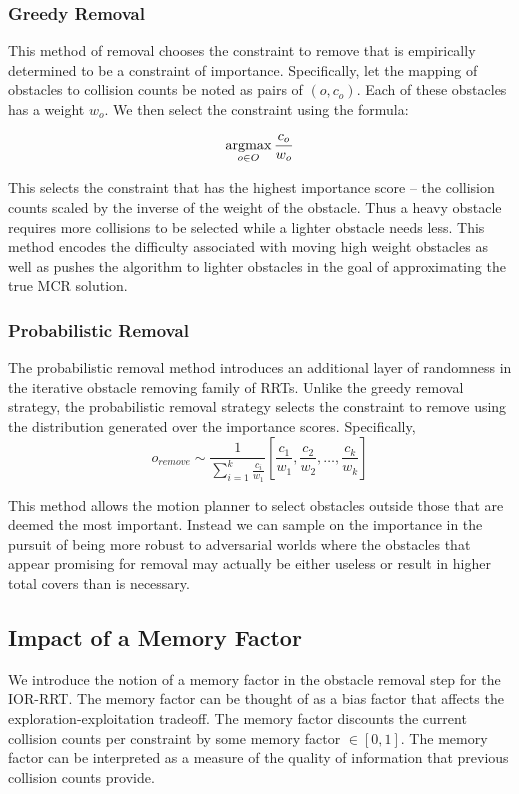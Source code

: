 \subsubsection{Greedy Removal}
This method of removal chooses the constraint to remove that is empirically determined to be a constraint of importance. Specifically, let the mapping of obstacles to collision counts be noted as pairs of $(o, c_o)$. Each of these obstacles has a weight $w_o$. We then select the constraint using the formula:

$$\operatorname*{argmax}\limits_{o \in O} \frac{c_o}{w_o}$$

This selects the constraint that has the highest importance score -- the collision counts scaled by the inverse of the weight of the obstacle. Thus a heavy obstacle requires more collisions to be selected while a lighter obstacle needs less. This method encodes the difficulty associated with moving high weight obstacles as well as pushes the algorithm to lighter obstacles in the goal of approximating the true MCR solution.

\subsubsection{Probabilistic Removal}
The probabilistic removal method introduces an additional layer of randomness in the iterative obstacle removing family of RRTs. Unlike the greedy removal strategy, the probabilistic removal strategy selects the constraint to remove using the distribution generated over the importance scores. Specifically,
$$o_{remove} \sim \frac{1}{\sum_{i=1}^k \frac{c_i}{w_1}}[\frac{c_1}{w_1}, \frac{c_2}{w_2},\ldots, \frac{c_k}{w_k}]$$

This method allows the motion planner to select obstacles outside those that are deemed the most important. Instead we can sample on the importance in the pursuit of being more robust to adversarial worlds where the obstacles that appear promising for removal may actually be either useless or result in higher total covers than is necessary. 


\subsection{Impact of a Memory Factor}
We introduce the notion of a memory factor in the obstacle removal step for the IOR-RRT. The memory factor can be thought of as a bias factor that affects the exploration-exploitation tradeoff. The memory factor discounts the current collision counts per constraint by some memory factor $\in [0,1]$. The memory factor can be interpreted as a measure of the quality of information that previous collision counts provide.

